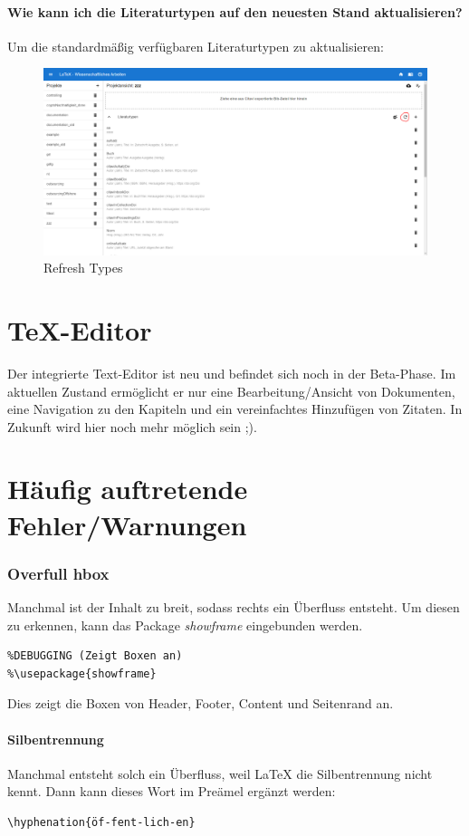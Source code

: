 \documentclass[12pt]{article}
\begin{document}
\subsection{Wie kann ich die Literaturtypen auf den neuesten Stand aktualisieren?}
Um die standardmäßig verfügbaren Literaturtypen zu aktualisieren:
\FloatBarrier
\begin{figure}[!ht]
\includegraphics[width=.9\textwidth]{images/refreshTypes.png}
\caption{Refresh Types}
\end{figure}
\FloatBarrier
\part{TeX-Editor}
Der integrierte Text-Editor ist neu und befindet sich noch in der Beta-Phase. Im aktuellen Zustand ermöglicht er nur eine Bearbeitung/Ansicht von Dokumenten, eine Navigation zu den Kapiteln und ein vereinfachtes Hinzufügen von Zitaten. In Zukunft wird hier noch mehr möglich sein ;).

\part{Häufig auftretende Fehler/Warnungen}
\section{Overfull hbox}
Manchmal ist der Inhalt zu breit, sodass rechts ein Überfluss entsteht. Um diesen zu erkennen, kann das Package \textit{showframe}  eingebunden werden.
\begin{verbatim}
%DEBUGGING (Zeigt Boxen an)
%\usepackage{showframe}
\end{verbatim}
Dies zeigt die Boxen von Header, Footer, Content und Seitenrand an.
\subsection{Silbentrennung}
Manchmal entsteht solch ein Überfluss, weil LaTeX die Silbentrennung nicht kennt. Dann kann dieses Wort im Preämel ergänzt werden:
\begin{verbatim}
\hyphenation{öf-fent-lich-en}
\end{verbatim}
\end{document}
